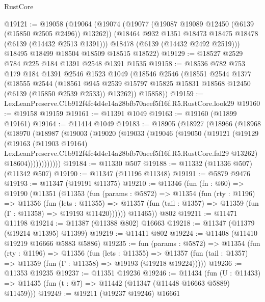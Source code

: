 \begin{lexlean}{RustCore}
\begin{coremodule}
@19121 := @19058
    (@19064
      (@19074
        (@19077 (@19087 @19089 @12450 (@6139 (@15850 @2505 @2496)) @13262))
        (@18464 @932 @1351 @18473 @18475 @18478 (@6139 (@14432 @2513 @1391)))
        @18478
        (@6139 (@14432 @2492 @2519)))
      @18495
      @18499
      @18504
      @18509
      @18515
      @18522)
@19129 := @18527 @2529 @784 @225 @184 @1391 @2548 @1391 @1535
@19158 := @18536
    @782
    @753
    @179
    @184
    @1391
    @2546
    @1523
    @1049
    (@18546
      @2546
      (@18551
        @2544
        @1377
        (@18555
          @2544
          (@18561
            @945
            @2539
            @15797
            @15825
            @15831
            @18568
            @12450
            (@6139 (@15850 @2539 @2533))
            @13262))
        @15858))
@19159 := LexLeanPreserve.C1b912f4fc4d4e14a28bfb70aeef5f16f.R5.RustCore.look29
@19160 := @19158 @19159
@19161 := @11391 @1049
@19163 := @19160 (@11899 @19161)
@19164 := @11414 @1049
@19183 := @18905
    (@18927
      (@18966
        (@18968
          (@18970
            (@18987
              (@19003
                (@19020
                  (@19033
                    (@19046
                      (@19050
                        (@19121
                          (@19129
                            (@19163
                              (@11903 @19164)
                              LexLeanPreserve.C1b912f4fc4d4e14a28bfb70aeef5f16f.R5.RustCore.fal29
                              @13262)
                            @18604))))))))))))
@19184 := @11330 @507
@19188 := @11332 (@11336 @507) (@11342 @507)
@19190 := @11347 (@11196 @11348)
@19191 := @5879 @9476
@19193 := @11347 (@19191 @11375)
@19210 := @11346
    (fun (fn : @60) =>
    @19190
      (@11351
        (@11353
          (fun (params : @5872) =>
          @11354
            (fun (rty : @1196) =>
            @11356
              (fun (lets : @11355) =>
              @11357 (fun (tail : @1357) => @11359 (fun (Γ : @11358) => @19193 @11420))))))
        @11465))
    @802
@19211 := @11471 @11198
@19214 := @11387 (@11388 @802) @16663
@19218 := @11347 (@11379 (@19214 @11395) @11399)
@19219 := @11411 @802
@19224 := @11408 (@11410 @19219 @16666 @5883 @5886)
@19235 := fun (params : @5872) =>
  @11354
    (fun (rty : @1196) =>
    @11356
      (fun (lets : @11355) =>
      @11357 (fun (tail : @1357) => @11359 (fun (Γ : @11358) => @19193 (@19218 @19224)))))
@19236 := @11353 @19235
@19237 := @11351 @19236
@19246 := @11434
    (fun (U : @11433) => @11435 (fun (t : @7) => @11442 (@11347 (@11448 @16663 @5889) @11459)))
@19249 := @19211 (@19237 @19246) @16661

\end{coremodule}
\end{lexlean}
